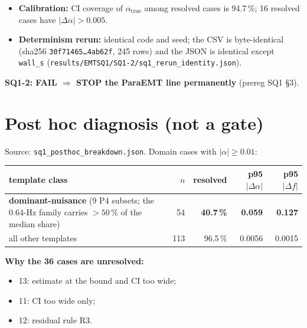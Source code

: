 \documentclass[10pt,a4paper]{article}
\newcommand{\f}[1]{\nolinkurl{#1}}
\begin{document}
\medskip
\begin{itemize}
\item \textbf{Calibration:} CI coverage of $\alpha_\text{true}$ among resolved cases is 94.7\,\%; 16 resolved cases have $|\Delta\alpha|>0.005$.
\item \textbf{Determinism rerun:} identical code and seed; the CSV is byte-identical (sha256 \texttt{30f71465\ldots4ab62f}, 245 rows) and the JSON is identical except \texttt{wall\_s} (\f{results/EMTSQ1/SQ1-2/sq1_rerun_identity.json}).
\end{itemize}
\textbf{SQ1-2: FAIL $\Rightarrow$ STOP the ParaEMT line permanently} (prereg SQ1 \S3).

\section{Post hoc diagnosis (not a gate)}
Source: \f{sq1_posthoc_breakdown.json}. Domain cases with $|\alpha|\ge0.01$:

\medskip
\noindent\begin{tabularx}{\linewidth}{@{}Yrrrr@{}}
\toprule
template class & $n$ & resolved & p95 $|\Delta\alpha|$ & p95 $|\Delta f|$\\
\midrule
\textbf{dominant-nuisance} (9 P4 subsets; the 0.64-Hz family carries $>50\,\%$ of the median share) & 54 & \textbf{40.7\,\%} & \textbf{0.059} & \textbf{0.127}\\
all other templates & 113 & 96.5\,\% & 0.0056 & 0.0015\\
\bottomrule
\end{tabularx}

\medskip
\noindent\textbf{Why the 36 cases are unresolved:}
\begin{itemize}
\item 13: estimate at the bound and CI too wide;
\item 11: CI too wide only;
\item 12: residual rule R3.
\end{itemize}
\end{document}
